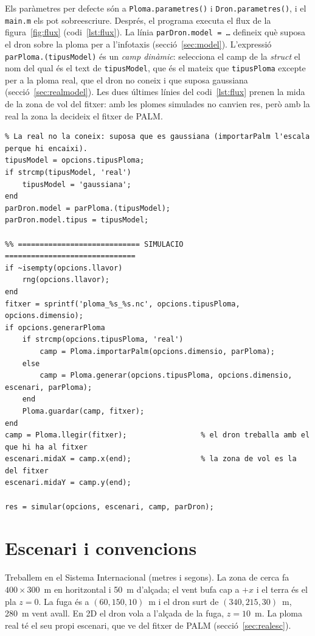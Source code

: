 \documentclass[11pt,a4paper]{article}
\begin{document}
Els paràmetres per defecte són a \texttt{Ploma.parametres()} i \texttt{Dron.parametres()}, i el \texttt{main.m} els pot sobreescriure. Després, el programa executa el flux de la figura~\ref{fig:flux} (codi~\ref{lst:flux}). La línia \texttt{parDron.model = \ldots} defineix què suposa el dron sobre la ploma per a l'infotaxis (secció~\ref{sec:model}). L'expressió \texttt{parPloma.(}\allowbreak\texttt{tipusModel)} és un \emph{camp dinàmic}: selecciona el camp de la \emph{struct} el nom del qual és el text de \texttt{tipusModel}, que és el mateix que \texttt{tipusPloma} excepte per a la ploma real, que el dron no coneix i que suposa gaussiana (secció~\ref{sec:realmodel}). Les dues últimes línies del codi~\ref{lst:flux} prenen la mida de la zona de vol del fitxer: amb les plomes simulades no canvien res, però amb la real la zona la decideix el fitxer de PALM.

\begin{lstlisting}[caption={Model del dron i flux principal del \texttt{main.m}.}, label=lst:flux]
% El que el dron sap de la ploma (per a l'infotaxis): li diem el tipus i els seus parametres.
% La real no la coneix: suposa que es gaussiana (importarPalm l'escala perque hi encaixi).
tipusModel = opcions.tipusPloma;
if strcmp(tipusModel, 'real')
    tipusModel = 'gaussiana';
end
parDron.model = parPloma.(tipusModel);
parDron.model.tipus = tipusModel;

%% ============================ SIMULACIO ==============================
if ~isempty(opcions.llavor)
    rng(opcions.llavor);
end
fitxer = sprintf('ploma_%s_%s.nc', opcions.tipusPloma, opcions.dimensio);
if opcions.generarPloma
    if strcmp(opcions.tipusPloma, 'real')
        camp = Ploma.importarPalm(opcions.dimensio, parPloma);
    else
        camp = Ploma.generar(opcions.tipusPloma, opcions.dimensio, escenari, parPloma);
    end
    Ploma.guardar(camp, fitxer);
end
camp = Ploma.llegir(fitxer);                 % el dron treballa amb el que hi ha al fitxer
escenari.midaX = camp.x(end);                % la zona de vol es la del fitxer
escenari.midaY = camp.y(end);

res = simular(opcions, escenari, camp, parDron);
\end{lstlisting}

\section{Escenari i convencions}

Treballem en el Sistema Internacional (metres i segons). La zona de cerca fa $400 \times 300$~m en horitzontal i 50~m d'alçada; el vent bufa cap a $+x$ i el terra és el pla $z = 0$. La fuga és a $(60, 150, 10)$~m i el dron surt de $(340, 215, 30)$~m, 280~m vent avall. En 2D el dron vola a l'alçada de la fuga, $z = 10$~m. La ploma real té el seu propi escenari, que ve del fitxer de PALM (secció~\ref{sec:realesc}).
\end{document}
